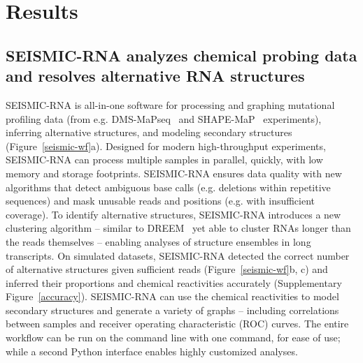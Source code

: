 \documentclass[main.tex]{subfiles}
\begin{document}
\section{Results}

\subsection{SEISMIC-RNA analyzes chemical probing data and resolves alternative RNA structures}


SEISMIC-RNA is all-in-one software for processing and graphing mutational profiling data (from e.g. DMS-MaPseq~\cite{Zubradt2016} and SHAPE-MaP~\cite{Siegfried2014} experiments), inferring alternative structures, and modeling secondary structures (Figure~\ref{seismic-wf}a).
Designed for modern high-throughput experiments, SEISMIC-RNA can process multiple samples in parallel, quickly, with low memory and storage footprints.
SEISMIC-RNA ensures data quality with new algorithms that detect ambiguous base calls (e.g. deletions within repetitive sequences) and mask unusable reads and positions (e.g. with insufficient coverage).
To identify alternative structures, SEISMIC-RNA introduces a new clustering algorithm -- similar to DREEM~\cite{Tomezsko2020} yet able to cluster RNAs longer than the reads themselves -- enabling analyses of structure ensembles in long transcripts.
On simulated datasets, SEISMIC-RNA detected the correct number of alternative structures given sufficient reads (Figure~\ref{seismic-wf}b, c) and inferred their proportions and chemical reactivities accurately (Supplementary Figure~\ref{accuracy}).
SEISMIC-RNA can use the chemical reactivities to model secondary structures and generate a variety of graphs -- including correlations between samples and receiver operating characteristic (ROC) curves.
The entire workflow can be run on the command line with one command, for ease of use; while a second Python interface enables highly customized analyses.
\end{document}
